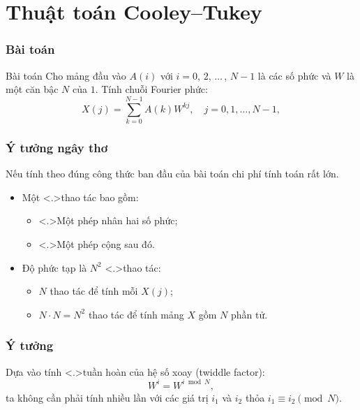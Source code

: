 \section{Thuật toán Cooley--Tukey}

\begin{frame}
  \frametitle{Bài toán}

  \begin{block}{Bài toán}
    Cho mảng đầu vào $A(i)$ với $i = 0$, $2$, $\ldots\,$, $N - 1$ là các số
    phức và $W$ là một căn bậc $N$ của $1$. Tính chuỗi
    Fourier phức: \begin{equation}
      X(j) = \sum_{k = 0}^{N - 1} A(k)W^{kj}, \quad j = 0, 1, \dots, N - 1,
    \end{equation}
  \end{block}
\end{frame}

\begin{frame}
  \frametitle{Ý tưởng ngây thơ}

  Nếu tính theo đúng công thức ban đầu của bài toán chi phí tính toán rất lớn.
  \onslide<+->
  \begin{itemize}[<+->]
    \item Một \alert<.>{thao tác} bao gồm: \begin{itemize}[<+->]
      \item \alert<.>{Một phép nhân} hai số phức;
      \item \alert<.>{Một phép cộng} sau đó.
      \end{itemize}
    \item Độ phức tạp là $N^2$ \alert<.>{thao tác}: \begin{itemize}[<+->]
      \item $N$ thao tác để tính mỗi $X(j)$;
      \item $N \cdot N = N^2$ thao tác để tính mảng $X$ gồm $N$ phần tử.
    \end{itemize}
  \end{itemize}
\end{frame}

\begin{frame}
  \frametitle{Ý tưởng}

  Dựa vào tính \alert<.>{tuần hoàn} của hệ số xoay (twiddle factor):
  \begin{equation*}
    W^{i} = W^{i \bmod N},
  \end{equation*} ta không cần phải tính nhiều lần với các giá trị $i_1$ và
  $i_2$ thỏa $i_1 \equiv i_2 \pmod{N}$.
\end{frame}

